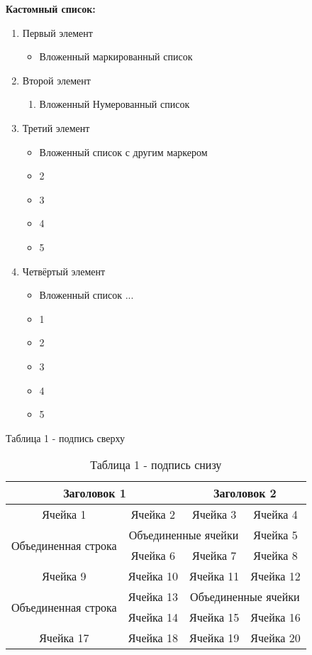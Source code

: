\documentclass[14pt]{article}
\begin{document}
\textbf{Кастомный список:}
\begin{enumerate}
    \item Первый элемент
    \begin{itemize}
        \item Вложенный маркированный список
    \end{itemize}
    \item Второй элемент
    \begin{enumerate}
        \item Вложенный Нумерованный список
    \end{enumerate}
    \item Третий элемент
    \begin{itemize}[label=$\bigodot$]
        \item Вложенный список с другим маркером
        \item 2
        \item 3
        \item 4
        \item 5
    \end{itemize}
    \item Четвёртый элемент
    \begin{itemize}[topsep=10pt, partopsep=10pt,itemsep = 10pt, parsep=10pt, left = 50pt]
        \item Вложенный список ...
        \item 1
        \item 2
        \item 3
        \item 4
        \item 5
    \end{itemize}
\end{enumerate}
\newpage
\begin{table}[h]
    \centering
    \caption*{Таблица 1 - подпись сверху
    }
    \begin{tabular}{|c|c|c|c|}
        \hline
        \multicolumn{2}{|c|}{Заголовок 1} & \multicolumn{2}{c|}{Заголовок 2} \\
        \hline
        Ячейка 1 & Ячейка 2 & Ячейка 3 & Ячейка 4 \\
        \hline
        \multirow{2}{*}{Объединенная строка} & \multicolumn{2}{|c|}{Объединенные ячейки} & Ячейка 5 \\
        \cline{2-4}
        & Ячейка 6 & Ячейка 7 & Ячейка 8 \\
        \hline
        Ячейка 9 & Ячейка 10 & Ячейка 11 & Ячейка 12 \\
        \hline
        \multirow{2}{*}{Объединенная строка} & Ячейка 13 & \multicolumn{2}{|c|}{Объединенные ячейки} \\
        \cline{2-4}
        & Ячейка 14 & Ячейка 15 & Ячейка 16 \\
        \hline
        Ячейка 17 & Ячейка 18 & Ячейка 19 & Ячейка 20 \\
        \hline
        
        \end{tabular}
    \caption*{Таблица 1 - подпись снизу}
\end{table}
\end{document}
